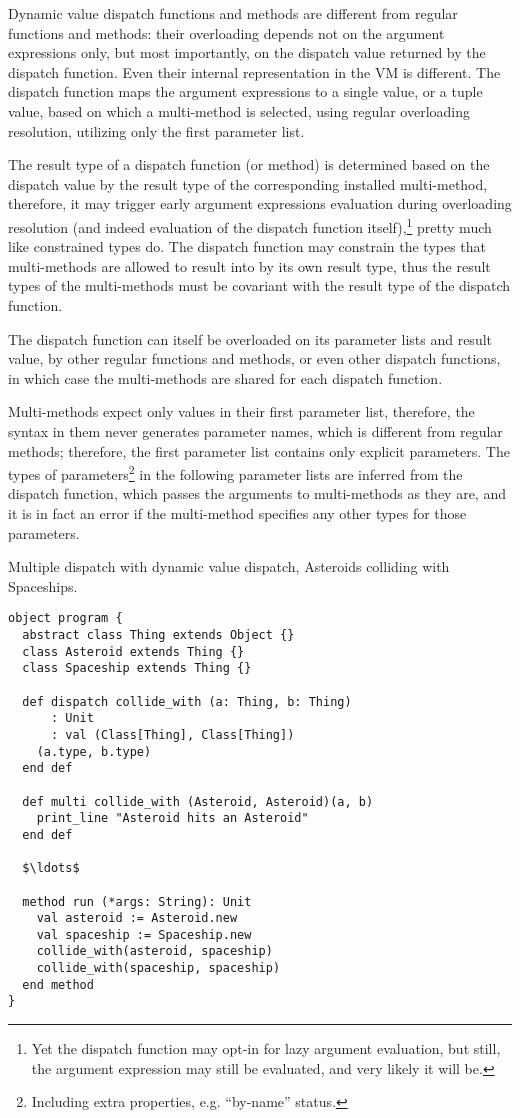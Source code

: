 Dynamic value dispatch functions and methods are different from regular functions and methods: their overloading depends not on the argument expressions only, but most importantly, on the dispatch value returned by the dispatch function. Even their internal representation in the VM is different. The dispatch function maps the argument expressions to a single value, or a tuple value, based on which a multi-method is selected, using regular overloading resolution, utilizing only the first parameter list. 

The result type of a dispatch function (or method) is determined based on the dispatch value by the result type of the corresponding installed multi-method, therefore, it may trigger early argument expressions evaluation during overloading resolution (and indeed evaluation of the dispatch function itself),\footnote{Yet the dispatch function may opt-in for lazy argument evaluation, but still, the argument expression may still be evaluated, and very likely it will be.} pretty much like constrained types do. The dispatch function may constrain the types that multi-methods are allowed to result into by its own result type, thus the result types of the multi-methods must be covariant with the result type of the dispatch function. 

The dispatch function can itself be overloaded on its parameter lists and result value, by other regular functions and methods, or even other dispatch functions, in which case the multi-methods are shared for each dispatch function. 

Multi-methods expect only values in their first parameter list, therefore, the syntax in them never generates parameter names, which is different from regular methods; therefore, the first parameter list contains only explicit parameters. The types of parameters\footnote{Including extra properties, e.g. ``by-name'' status.} in the following parameter lists are inferred from the dispatch function, which passes the arguments to multi-methods as they are, and it is in fact an error if the multi-method specifies any other types for those parameters. 

\example Multiple dispatch with dynamic value dispatch, Asteroids colliding with Spaceships.
\begin{lstlisting}
object program {
  abstract class Thing extends Object {}
  class Asteroid extends Thing {}
  class Spaceship extends Thing {}
  
  def dispatch collide_with (a: Thing, b: Thing)
      : Unit 
      : val (Class[Thing], Class[Thing])
    (a.type, b.type)
  end def
  
  def multi collide_with (Asteroid, Asteroid)(a, b)
    print_line "Asteroid hits an Asteroid"
  end def
  
  $\ldots$
  
  method run (*args: String): Unit
    val asteroid := Asteroid.new
    val spaceship := Spaceship.new
    collide_with(asteroid, spaceship)
    collide_with(spaceship, spaceship)
  end method
}
\end{lstlisting}

